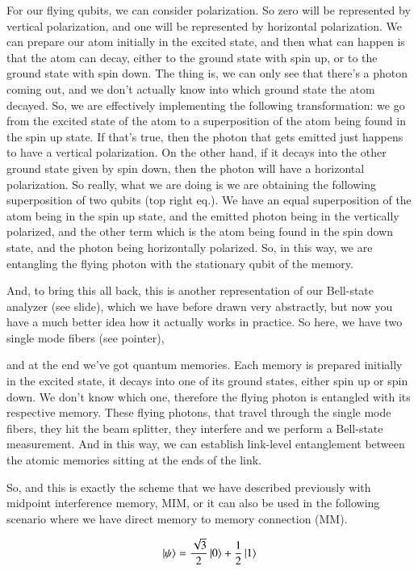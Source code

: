 For our flying qubits, we can consider polarization. So zero will be represented by vertical polarization, and one will be represented by horizontal polarization. We can prepare our atom initially in the excited state, and then what can happen is that the atom can decay, either to the ground state with spin up, or to the ground state with spin down. The thing is, we can only see that there's a photon coming out, and we don't actually know into which ground state the atom decayed. So, we are effectively implementing the following transformation: we go from the excited state of the atom to a superposition of the atom being found in the spin up state. If that's true, then the photon that gets emitted just happens to have a vertical polarization. On the other hand, if it decays into the other ground state given by spin down, then the photon will have a horizontal polarization. So really, what we are doing is we are obtaining the following superposition of two qubits (top right eq.). We have an equal superposition of the atom being in the spin up state, and the emitted photon being in the vertically polarized, and the other term which is the atom being found in the spin down state, and the photon being horizontally polarized. So, in this way, we are entangling the flying photon with the stationary qubit of the memory.

And, to bring this all back, this is another representation of our Bell-state analyzer (see slide), which we have before drawn very abstractly, but now you have a much better idea how it actually works in practice. So here, we have two single mode fibers (see pointer),

and at the end we've got quantum memories. Each memory is prepared initially in the excited state, it decays into one of its ground states, either spin up or spin down. We don't know which one, therefore the flying photon is entangled with its respective memory. These flying photons, that travel through the single mode fibers, they hit the beam splitter, they interfere and we perform a Bell-state measurement. And in this way, we can establish link-level entanglement between the atomic memories sitting at the ends of the link.

So, and this is exactly the scheme that we have described previously with midpoint interference memory, MIM, or it can also be used in the following scenario where we have direct memory to memory connection (MM).



\newpage
\begin{exercises}
\begin{equation*}
\ket{\psi} = \frac{\sqrt{3}}{2}\ket{0} + \frac{1}{2}\ket{1}
\end{equation*}


\end{exercises}

